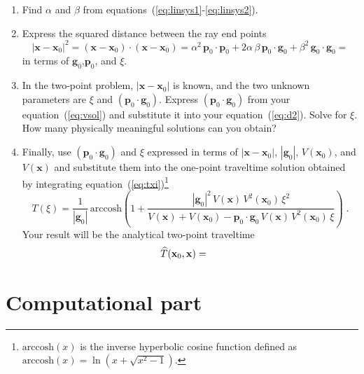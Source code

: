 \begin{enumerate}
\begin{enumerate}
\item Find $\alpha$ and $\beta$ from
  equations~(\ref{eq:linsys1}-\ref{eq:linsys2}).
\item Express the squared distance between the ray end points
  \begin{equation}
    \label{eq:d2} 
    |\mathbf{x} - \mathbf{x}_0|^2 = (\mathbf{x} - \mathbf{x}_0) \cdot (\mathbf{x} - \mathbf{x}_0) =
    \alpha^2\,\mathbf{p}_0 \cdot \mathbf{p}_0 + 2 \alpha\,\beta\,\mathbf{p}_0 \cdot \mathbf{g}_0 +
    \beta^2\,\mathbf{g}_0 \cdot \mathbf{g}_0 =
  \end{equation}
  in terms of $\mathbf{g}_0$,$\mathbf{p}_0$, and $\xi$. 
\item In the two-point problem, $|\mathbf{x} - \mathbf{x}_0|$ is known, and the two unknown
  parameters are $\xi$ and $(\mathbf{p}_0 \cdot \mathbf{g}_0)$.
  Express $(\mathbf{p}_0 \cdot \mathbf{g}_0)$ from your
  equation~(\ref{eq:vsol}) and substitute it into your
  equation~(\ref{eq:d2}). Solve for $\xi$. How many physically
  meaningful solutions can you obtain?
\item Finally, use $(\mathbf{p}_0 \cdot \mathbf{g}_0)$ and $\xi$
  expressed in terms of $|\mathbf{x} - \mathbf{x}_0|$, $|\mathbf{g}_0|$, $V(\mathbf{x}_0)$, and
  $V(\mathbf{x})$ and substitute them into the one-point traveltime
  solution obtained by integrating
  equation~(\ref{eq:txi})\footnote{$\mbox{arccosh}(x)$ is the inverse
    hyperbolic cosine function defined as $\mbox{arccosh}(x) = \ln\left(x + \sqrt{x^2-1}\right)$.}
  \begin{equation}
    \label{eq:t1}
    T(\xi) = \frac{1}{|\mathbf{g}_0|}\,\mbox{arccosh}\left(1 + \frac{|\mathbf{g}_0|^2\,V(\mathbf{x})\,V^2(\mathbf{x}_0)\,\xi^2}
      {V(\mathbf{x})+V(\mathbf{x}_0) - \mathbf{p}_0 \cdot \mathbf{g}_0\,V(\mathbf{x})\,V^2(\mathbf{x}_0)\,\xi}\right)\;.
  \end{equation}
  Your result will be the analytical two-point traveltime
  \begin{eqnarray}
    \label{eq:t2}
    \widehat{T}(\mathbf{x}_0,\mathbf{x}) = & & \hfill \ 
  \end{eqnarray}
\end{enumerate}
\end{enumerate}

\newpage

\section{Computational part}



